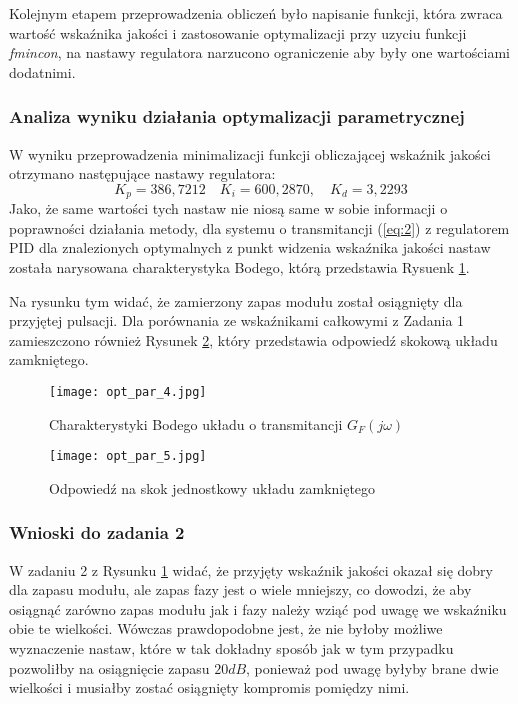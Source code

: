 \documentclass[a4paper,11pt]{article}
\begin{document}
Kolejnym etapem przeprowadzenia obliczeń było napisanie funkcji, która zwraca wartość wskaźnika jakości i zastosowanie optymalizacji przy uzyciu funkcji \textit{fmincon}, na nastawy regulatora narzucono ograniczenie aby były one wartościami dodatnimi.

\subsubsection{Analiza wyniku działania optymalizacji parametrycznej}

W wyniku przeprowadzenia minimalizacji funkcji obliczającej wskaźnik jakości otrzymano następujące nastawy regulatora:
\begin{equation*}
K_{p} = 386,7212 \quad K_{i} = 600,2870, \quad K_{d} = 3,2293
\end{equation*}
Jako, że same wartości tych nastaw nie niosą same w sobie informacji o poprawności działania metody, dla systemu o transmitancji (\ref{eq:2}) z regulatorem PID dla znalezionych optymalnych z punkt widzenia wskaźnika jakości nastaw została narysowana charakterystyka Bodego, którą przedstawia Rysuenk \ref{fig:opt_par_4}.

Na rysunku tym widać, że zamierzony zapas modułu został osiągnięty dla przyjętej pulsacji. Dla porównania ze wskaźnikami całkowymi z Zadania 1 zamieszczono również Rysunek \ref{fig:opt_par_5}, który przedstawia odpowiedź skokową układu zamkniętego.

\begin{figure}[H]
\centerline{\texttt{[image: opt\_par\_4.jpg]}}
\caption{Charakterystyki Bodego układu o transmitancji \(G_{F}(j \omega )\)  }
\label{fig:opt_par_4}
\end{figure}

\begin{figure}[H]
\centerline{\texttt{[image: opt\_par\_5.jpg]}}
\caption{Odpowiedź na skok jednostkowy układu zamkniętego}
\label{fig:opt_par_5}
\end{figure}

\subsubsection{Wnioski do zadania 2}
W zadaniu 2 z Rysunku \ref{fig:opt_par_4} widać, że przyjęty wskaźnik jakości okazał się dobry dla zapasu modułu, ale zapas fazy jest o wiele mniejszy, co dowodzi, że aby osiągnąć zarówno zapas modułu jak i fazy należy wziąć pod uwagę we wskaźniku obie te wielkości. Wówczas prawdopodobne jest, że nie byłoby możliwe wyznaczenie nastaw, które w tak dokładny sposób jak w tym przypadku pozwoliłby na osiągnięcie zapasu \(20dB\), ponieważ pod uwagę byłyby brane dwie wielkości i musiałby zostać osiągnięty kompromis pomiędzy nimi.  \\
\end{document}
